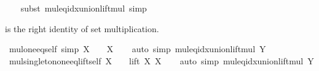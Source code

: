\begin{isabellebody}
%
\isadelimproof
\ \ %
\endisadelimproof
%
\isatagproof
{}\isamarkupfalse%
\ {\isacharparenleft}{\kern0pt}subst\ mul{\isacharunderscore}{\kern0pt}eq{\isacharunderscore}{\kern0pt}idx{\isacharunderscore}{\kern0pt}union{\isacharunderscore}{\kern0pt}lift{\isacharunderscore}{\kern0pt}mul{\isacharparenright}{\kern0pt}\ simp%
\endisatagproof
{\isafoldproof}%
%
\isadelimproof
%
\endisadelimproof
%
\begin{isamarkuptext}%
 is the right identity of set multiplication.%
\end{isamarkuptext}\isamarkuptrue%
\isamarkupfalse%
\ mul{\isacharunderscore}{\kern0pt}one{\isacharunderscore}{\kern0pt}eq{\isacharunderscore}{\kern0pt}self\ {\isacharbrackleft}{\kern0pt}simp{\isacharbrackright}{\kern0pt}{\isacharcolon}{\kern0pt}\ {\isachardoublequoteopen}X\ {\isacharasterisk}{\kern0pt}\ {}\ {\isacharequal}{\kern0pt}\ X{\isachardoublequoteclose}\isanewline
%
\isadelimproof
\ \ %
\endisadelimproof
%
\isatagproof
{}\isamarkupfalse%
\ {\isacharparenleft}{\kern0pt}auto\ simp{\isacharcolon}{\kern0pt}\ mul{\isacharunderscore}{\kern0pt}eq{\isacharunderscore}{\kern0pt}idx{\isacharunderscore}{\kern0pt}union{\isacharunderscore}{\kern0pt}lift{\isacharunderscore}{\kern0pt}mul{\isacharbrackleft}{\kern0pt}\ {\isacharquery}{\kern0pt}Y{\isacharequal}{\kern0pt}{}{\isacharbrackright}{\kern0pt}{\isacharparenright}{\kern0pt}%
\endisatagproof
{\isafoldproof}%
%
\isadelimproof
\isanewline
%
\endisadelimproof
\isanewline
{}\isamarkupfalse%
\ mul{\isacharunderscore}{\kern0pt}singleton{\isacharunderscore}{\kern0pt}one{\isacharunderscore}{\kern0pt}eq{\isacharunderscore}{\kern0pt}lift{\isacharunderscore}{\kern0pt}self{\isacharcolon}{\kern0pt}\ {\isachardoublequoteopen}X\ {\isacharasterisk}{\kern0pt}\ {\isacharbraceleft}{\kern0pt}{}{\isacharbraceright}{\kern0pt}\ {\isacharequal}{\kern0pt}\ lift\ X\ X{\isachardoublequoteclose}\isanewline
%
\isadelimproof
\ \ %
\endisadelimproof
%
\isatagproof
{}\isamarkupfalse%
\ {\isacharparenleft}{\kern0pt}auto\ simp{\isacharcolon}{\kern0pt}\ mul{\isacharunderscore}{\kern0pt}eq{\isacharunderscore}{\kern0pt}idx{\isacharunderscore}{\kern0pt}union{\isacharunderscore}{\kern0pt}lift{\isacharunderscore}{\kern0pt}mul{\isacharbrackleft}{\kern0pt}\ {\isacharquery}{\kern0pt}Y{\isacharequal}{\kern0pt}{\isachardoublequoteopen}{\isacharbraceleft}{\kern0pt}{}{\isacharbraceright}{\kern0pt}{\isachardoublequoteclose}{\isacharbrackright}{\kern0pt}{\isacharparenright}{\kern0pt}%

\end{isabellebody}
